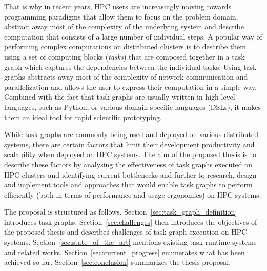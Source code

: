 That is why in recent years, HPC users are increasingly moving towards programming paradigms that
allow them to focus on the problem domain, abstract away most of the complexity of the underlying
system and describe computation that consists of a large number of individual steps.
A popular way of performing complex computations on distributed clusters is to describe them
using a set of computing blocks (\emph{tasks}) that are composed together in a task graph
which captures the dependencies between the individual tasks. Using task graphs abstracts away most
of the complexity of network communication and parallelization and allows the user to
express their computation in a simple way. Combined with the fact that task graphs are usually
written
in high-level languages, such as Python, or various domain-specific languages (DSLs), it makes them
an ideal tool for rapid scientific prototyping.

While task graphs are commonly being used and deployed on various distributed systems, there are
certain factors that limit their development productivity and scalability when deployed on HPC
systems. The aim of the proposed thesis is to describe these factors by analysing the effectiveness
of task graphs executed on HPC clusters and identifying current bottlenecks and
further to research, design and implement tools and approaches that would enable task graphs to
perform efficiently (both in terms of performance and usage ergonomics) on HPC systems.

The proposal is structured as follows. Section~\ref{sec:task_graph_definition} introduces task
graphs. Section~\ref{sec:challenges} then introduces the objectives of the proposed
thesis and describes challenges of task graph execution on HPC systems.
Section~\ref{sec:state_of_the_art} mentions existing task runtime systems and related
works. Section~\ref{sec:current_progress} enumerates what has been achieved so far.
Section~\ref{sec:conclusion} summarizes the thesis proposal.
